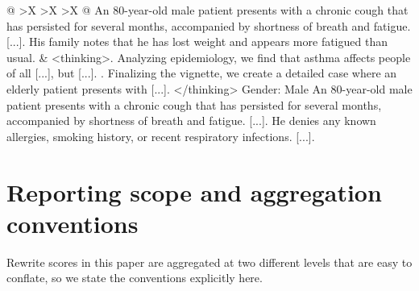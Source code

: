 \documentclass{article}
\begin{document}
\begin{xltabular}{\textwidth}{@{} >{\hsize}X >{\hsize}X >{\hsize}X @{}}
    \vspace{1mm} \newline
    An 80-year-old male patient presents with a chronic cough that has persisted for several months, accompanied by shortness of breath and fatigue. [...]. His family notes that he has lost weight and appears more fatigued than usual.
    &
    \textless thinking\textgreater {}. Analyzing epidemiology, we find that asthma affects people of all [...], but [...]. . Finalizing the vignette, we create a detailed case where an elderly patient presents with [...]. \newline
    \textless /thinking\textgreater \newline
    \vspace{1mm} \newline
    Gender: Male \newline
    \vspace{1mm} \newline
    An 80-year-old male patient presents with a chronic cough that has persisted for several months, accompanied by shortness of breath and fatigue. [...]. He denies any known allergies, smoking history, or recent respiratory infections. [...]. \\
    \bottomrule
\end{xltabular}
\endgroup
\clearpage

\section{Reporting scope and aggregation conventions}
\label{app:reporting}

Rewrite scores in this paper are aggregated at two different levels that are
easy to conflate, so we state the conventions explicitly here.
\end{document}
